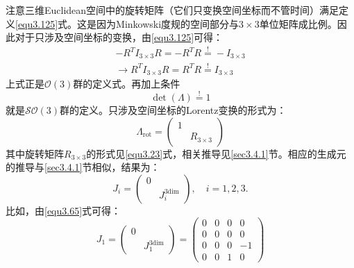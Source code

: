 注意三维Euclidean空间中的旋转矩阵（它们只变换空间坐标而不管时间）满足定义\eqref{equ3.125}式。这是因为Minkowski度规的空间部分与$3 \times 3$单位矩阵成比例。因此对于只涉及空间坐标的变换，由\eqref{equ3.125}可得：
\begin{align*}
	-R^T I_{3 \times 3} R = - R^T R \stackrel{!}{=} -I_{3 \times 3} \\
	\rightarrow R^T I_{3 \times 3} R = R^T R \stackrel{!}{=} I_{3 \times 3}
\end{align*}
上式正是$\mathcal{O}(3)$群的定义式。再加上条件
\begin{equation*}
	\det(\Lambda) \stackrel{!}{=} 1
\end{equation*}
就是$\mathcal{SO}(3)$群的定义。只涉及空间坐标的Lorentz变换的形式为：
\begin{equation*}
	\Lambda_{\mathrm{rot}} =
		\begin{pmatrix}
			1 & \\
			  & R_{3 \times 3}
		\end{pmatrix}
\end{equation*}
其中旋转矩阵$R_{3 \times 3}$的形式见\eqref{equ3.23}式，相关推导见\ref{sec3.4.1}节。相应的生成元的推导与\ref{sec3.4.1}节相似，结果为：
\begin{equation}
	\label{equ3.135}
	J_i =
		\begin{pmatrix}
			0 & \\
			  & J_i^{3\mathrm{dim}}
		\end{pmatrix}
	,\quad
	i = 1, 2, 3.
\end{equation}
比如，由\eqref{equ3.65}式可得：
\begin{equation}
	\label{equ3.136}
	J_1 =
		\begin{pmatrix}
			0 & \\
			  & J_1^{3 \mathrm{dim}}
		\end{pmatrix}
	=
		\begin{pmatrix}
			0 & 0 & 0 & 0 \\
			0 & 0 & 0 & 0 \\
			0 & 0 & 0 & -1 \\
			0 & 0 & 1 & 0
		\end{pmatrix}
\end{equation}

